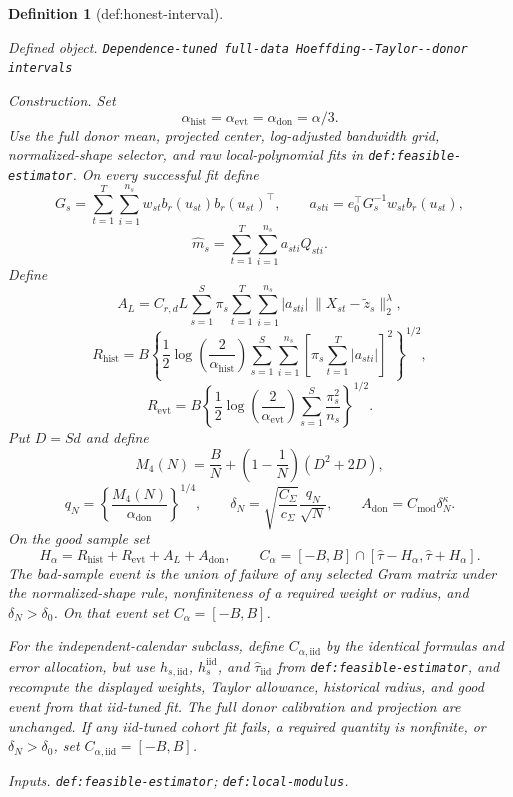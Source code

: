 \documentclass{article}
\newtheorem{definition}{Definition}
\begin{document}
\begin{definition}[def:honest-interval]\label{def:honest-interval}
\par\smallskip\noindent\emph{Defined object.} \texttt{Dependence-\allowbreak{}tuned full-\allowbreak{}data Hoeffding-\allowbreak{}-\allowbreak{}Taylor-\allowbreak{}-\allowbreak{}donor intervals}
\par\smallskip\noindent\emph{Construction.} Set
\[
\alpha_{\mathrm{hist}}=\alpha_{\mathrm{evt}}
=\alpha_{\mathrm{don}}=\alpha/3.
\]
Use the full donor mean, projected center, log-adjusted bandwidth grid, normalized-shape selector, and raw local-polynomial fits in \texttt{def:feasible-estimator}.  On every successful fit define
\[
G_s=\sum_{t=1}^{T}\sum_{i=1}^{n_s}
w_{st}b_r(u_{st})b_r(u_{st})^\top,
\qquad
a_{sti}=e_0^\top G_s^{-1}w_{st}b_r(u_{st}),
\]
\[
\widehat m_s=\sum_{t=1}^{T}\sum_{i=1}^{n_s}a_{sti}Q_{sti}.
\]
Define
\[
A_L=C_{r,d}L\sum_{s=1}^{S}\pi_s
\sum_{t=1}^{T}\sum_{i=1}^{n_s}
|a_{sti}|\,\|X_{st}-\widetilde z_s\|_2^\lambda,
\]
\[
R_{\mathrm{hist}}
=B\left\{
\frac12\log\left(\frac2{\alpha_{\mathrm{hist}}}\right)
\sum_{s=1}^{S}\sum_{i=1}^{n_s}
\left[\pi_s\sum_{t=1}^{T}|a_{sti}|\right]^2
\right\}^{1/2},
\]
\[
R_{\mathrm{evt}}
=B\left\{
\frac12\log\left(\frac2{\alpha_{\mathrm{evt}}}\right)
\sum_{s=1}^{S}\frac{\pi_s^2}{n_s}
\right\}^{1/2}.
\]
Put \(D=Sd\) and define
\[
M_4(N)=\frac BN+\left(1-\frac1N\right)(D^2+2D),
\]
\[
q_N=\left\{\frac{M_4(N)}{\alpha_{\mathrm{don}}}\right\}^{1/4},
\qquad
\delta_N=\sqrt{\frac{C_\Sigma}{c_\Sigma}}\frac{q_N}{\sqrt N},
\qquad
A_{\mathrm{don}}=C_{\mathrm{mod}}\delta_N^\kappa.
\]
On the good sample set
\[
H_\alpha=R_{\mathrm{hist}}+R_{\mathrm{evt}}+A_L+A_{\mathrm{don}},
\qquad
C_\alpha=[-B,B]\cap
[\widehat\tau-H_\alpha,\widehat\tau+H_\alpha].
\]
The bad-sample event is the union of failure of any selected Gram matrix under the normalized-shape rule, nonfiniteness of a required weight or radius, and \(\delta_N>\delta_0\).  On that event set \(C_\alpha=[-B,B]\).

For the independent-calendar subclass, define \(C_{\alpha,\mathrm{iid}}\) by the identical formulas and error allocation, but use \(h_{s,\mathrm{iid}}\), \(h_s^{\mathrm{iid}}\), and \(\widehat\tau_{\mathrm{iid}}\) from \texttt{def:feasible-estimator}, and recompute the displayed weights, Taylor allowance, historical radius, and good event from that iid-tuned fit.  The full donor calibration and projection are unchanged.  If any iid-tuned cohort fit fails, a required quantity is nonfinite, or \(\delta_N>\delta_0\), set \(C_{\alpha,\mathrm{iid}}=[-B,B]\).
\par\smallskip\noindent\emph{Inputs.} \texttt{def:\allowbreak{}feasible-\allowbreak{}estimator}; \texttt{def:\allowbreak{}local-\allowbreak{}modulus}.
\end{definition}
\end{document}

